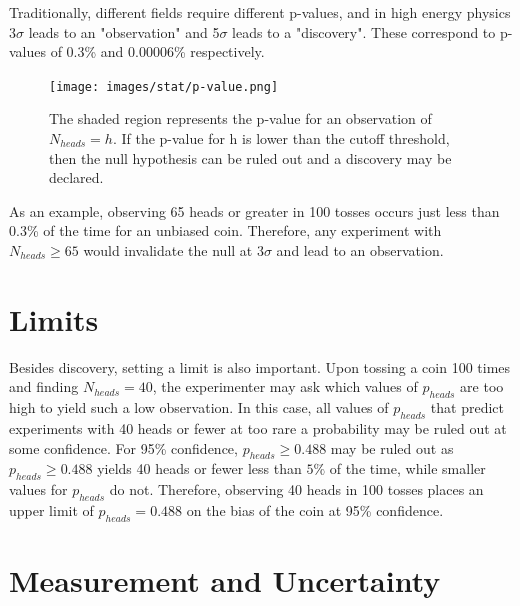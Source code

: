 Traditionally, different fields require different p-values, and in high energy physics 3$\sigma$ leads to an "observation" and 5$\sigma$ leads to a "discovery". These correspond to p-values of 0.3\% and 0.00006\% respectively. 
\begin{figure}[h!]
  \centering
  \texttt{[image: images/stat/p-value.png]}
  \caption[An illustrated example of a p-value.]
   {The shaded region represents the p-value for an observation of $N_{heads}=h$. If the p-value for h is lower than the cutoff threshold, then the null hypothesis can be ruled out and a discovery may be declared.}
\label{fig:pvalue_ex}
\end{figure}
As an example, observing 65 heads or greater in 100 tosses occurs just less than 0.3\% of the time for an unbiased coin. Therefore, any experiment with $N_{heads} \geq 65$ would invalidate the null at $3\sigma$ and lead to an observation.

\section{Limits}

Besides discovery, setting a limit is also important. Upon tossing a coin 100 times and finding $N_{heads}=40$, the experimenter may ask which values of $p_{heads}$ are too high to yield such a low observation. In this case, all values of $p_{heads}$ that predict experiments with 40 heads or fewer at too rare a probability may be ruled out at some confidence. For 95\% confidence, $p_{heads} \geq 0.488$ may be ruled out as $p_{heads} \geq 0.488$ yields 40 heads or fewer less than $5\%$ of the time, while smaller values for $p_{heads}$ do not. Therefore, observing 40 heads in 100 tosses places an upper limit of $p_{heads}=0.488$ on the bias of the coin at 95\% confidence. 

\section{Measurement and Uncertainty}
\label{meas}
 
